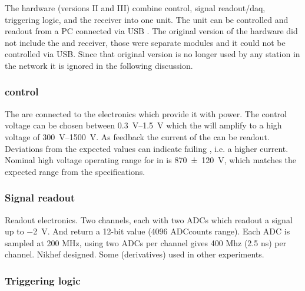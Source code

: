 The \hisparc hardware (versions II and III) combine \pmt control, signal readout/daq, triggering logic, and the \gps receiver into one unit. The unit can be controlled and readout from a PC connected via USB \cite{messages}. The original version of the \hisparc hardware did not include the \daq and \gps receiver, those were separate modules and it could not be controlled via USB. Since that original version is no longer used by any station in the network it is ignored in the following discussion.


\subsubsection{\pmt control}

The \pmts are connected to the \hisparc electronics which provide it with power. The control voltage can be chosen between \SIrange{.3}{1.5}{\volt} which the \pmt will amplify to a high voltage of \SIrange{300}{1500}{\volt}. As feedback the current of the \pmt can be readout. Deviations from the expected values can indicate failing \pmts, i.e. a higher current. Nominal high voltage operating range for \pmts in \hisparc is \SI{870\pm120}{\volt}, which matches the expected range from the \pmt specifications.


\subsubsection{Signal readout}

Readout electronics. Two channels, each with two ADCs which readout a signal up to \SI{-2}{\volt}. And return a 12-bit value (4096 ADCcounts range). Each ADC is sampled at 200 MHz, using two ADCs per channel gives 400 Mhz (2.5 ns) per channel. Nikhef designed. Some (derivatives) used in other experiments.


\subsubsection{Triggering logic}

%
%
%


